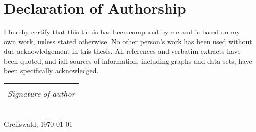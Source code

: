 \documentclass[
	10pt,
	twoside,
	chapterinoneline,
	onehalfspacing, %
	nolistspacing, %
	parskip, %
	headsepline, %
	english,
]{MastersDoctoralThesis} %
\makeatletter
\newcommand{\sign}[1]{%
  \begin{tabular}[t]{@{}c@{}}
  \makebox[1.5in]{\dotfill}\\
  \strut\emph{#1}\strut%
  \end{tabular}%
}
\makeatother
\begin{document}
	\chapter*{Declaration of Authorship}
%
		I hereby certify that this thesis has been composed by me and is based on 
		my own work, unless stated otherwise.	No other person’s work has been used
		without due acknowledgement in this thesis.
		All references and verbatim extracts have been quoted, and iall sources of
		information, including graphs and data sets, have been specifically
		acknowledged.\\[2.0cm]
%
		\begin{flushright}
			\sign{Signature of author}\\
			Greifswald; \today
		\end{flushright}
%
%
	\tableofcontents %
%
	
	\mainmatter%
	\pagestyle{thesis}
% 
	
%
	
	
	
	
	
	
	
	
	
	
	
	
	
	
%	
	\appendix %
\end{document}
